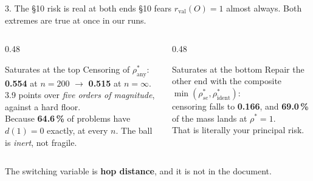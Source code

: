 \documentclass[10pt,aspectratio=169]{beamer}
\begin{document}
\begin{frame}{3. The \S10 risk is real at both ends}
\S10 fears $r_{\mathrm{val}}(O) = 1$ almost always. Both extremes are true at once in our runs.

\begin{columns}[T]
\begin{column}{0.48\textwidth}
\begin{alertblock}{Saturates at the top}
Censoring of $\rho^\ast_{\text{any}}$: \\
\textbf{0.554} at $n = 200$ $\to$ \textbf{0.515} at $n = \infty$. \\
3.9 points over \emph{five orders of magnitude}, against a hard floor. \\[0.4em]
Because \textbf{64.6\,\%} of problems have $d(1) = 0$ exactly, at every $n$. The ball is
\emph{inert}, not fragile.
\end{alertblock}
\end{column}
\begin{column}{0.48\textwidth}
\begin{alertblock}{Saturates at the bottom}
Repair the other end with the composite $\min(\rho^\ast_{se}, \rho^\ast_{\text{ident}})$: \\[0.4em]
censoring falls to \textbf{0.166}, and \textbf{69.0\,\%} of the mass lands at $\rho^\ast = 1$. \\[0.4em]
That is literally your principal risk.
\end{alertblock}
\end{column}
\end{columns}

\vspace{0.6em}
\begin{center}
\large The switching variable is \textbf{hop distance}, and it is not in the document.
\end{center}
\end{frame}
\end{document}
